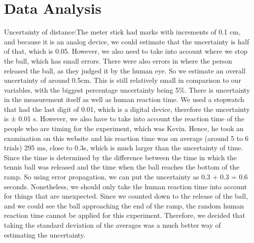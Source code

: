 \documentclass[12pt]{report}
\begin{document}
\section{Data Analysis}
 {\large {Uncertainty of distance:}}\newline The meter stick had marks with increments of 0.1 cm, and because it is an analog device, we could estimate that the uncertainty is half of that, which is 0.05. However, we also need to take into account where we stop the ball, which has small errors. There were also errors in where the person released the ball, as they judged it by the human eye. So we estimate an overall uncertainty of around 0.5cm. This is still relatively small in comparison to our variables, with the biggest percentage uncertainty being 5\%.\newline{} \newline There is uncertainty in the measurement itself as well as human reaction time. We used a stopwatch that had the last digit of 0.01, which is a digital device, therefore the uncertainty is ± 0.01 s. However, we also have to take into account the reaction time of the people who are timing for the experiment, which was Kevin. Hence, he took an examination on this website and his reaction time was on average (around 5 to 6 trials) 295 ms, close to 0.3s, which is much larger than the uncertainty of time. Since the time is determined by the difference between the time in which the tennis ball was released and the time when the ball reaches the bottom of the ramp. So using error propagation, we can put the uncertainty as 0.3 + 0.3 = 0.6 seconds. Nonetheless, we should only take the human reaction time into account for things that are unexpected. Since we counted down to the release of the ball, and we could see the ball approaching the end of the ramp, the random human reaction time cannot be applied for this experiment. Therefore, we decided that taking the standard deviation of the averages was a much better way of estimating the uncertainty.
\newline
\end{document}
